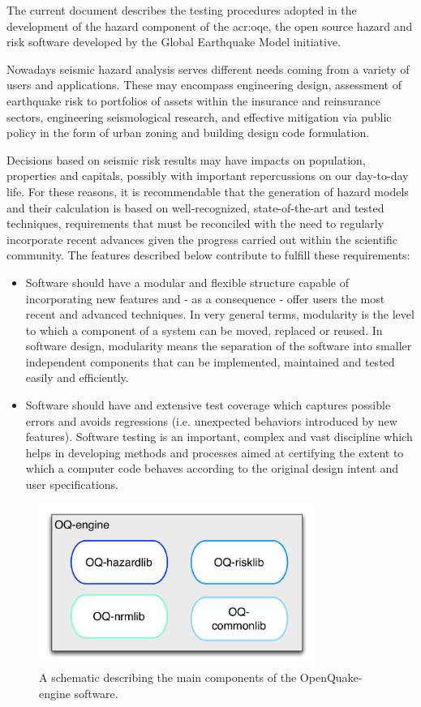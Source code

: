 The current document describes the testing procedures adopted in 
the development of the hazard component of the \gls{acr:oqe}, the 
open source hazard and risk software developed by the Global 
Earthquake Model initiative.

Nowadays seismic hazard analysis serves different needs coming 
from a variety of users and applications.
%
These may encompass engineering design, assessment of earthquake risk 
to portfolios of assets within the insurance and reinsurance sectors, 
engineering seismological research, and effective mitigation via public 
policy in the form of urban zoning and building design code formulation.

Decisions based on seismic risk results may have impacts on
population, properties and capitals, possibly with important repercussions 
on our day-to-day life. For these reasons, it is recommendable that 
the generation of hazard models and their calculation is based on 
well-recognized, state-of-the-art and tested techniques, requirements 
that must be reconciled with the need to regularly incorporate 
recent advances given the progress carried out within the 
scientific community.
%
The features described below contribute to fulfill these requirements: 
%
\begin{itemize}
    \item Software should have a modular and flexible structure capable of 
    incorporating new features and - as a consequence - offer users 
    the most recent and advanced techniques.
    In very general terms, modularity is the level to which a component 
    of a system can be moved, replaced or reused.
    In software design, modularity means the separation of the software
    into smaller independent components that can be implemented, maintained 
    and tested easily and efficiently.
    \item Software should have and extensive test coverage which captures 
    possible errors and avoids regressions (i.e. unexpected behaviors 
    introduced by new features).
    Software testing \parencite{myers2012} is an important, complex and 
    vast discipline which helps in developing methods and processes aimed at 
    certifying the extent to which a computer code behaves according 
    to the original design intent and user specifications.
\end{itemize}
\begin{figure}[!ht]
\centering
\includegraphics[width=9cm]{figures/oq-engine_structure.pdf}
\caption{A schematic describing the main components of the OpenQuake-engine 
    software.}
\label{fig:oqe_structure}
\end{figure}

